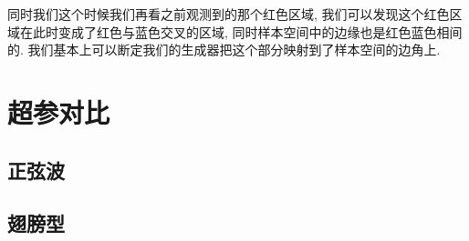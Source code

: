 \documentclass[lang=cn,11pt]{elegantpaper}
\begin{document}
同时我们这个时候我们再看之前观测到的那个红色区域, 我们可以发现这个红色区域在此时变成了红色与蓝色交叉的区域, 同时样本空间中的边缘也是红色蓝色相间的. 我们基本上可以断定我们的生成器把这个部分映射到了样本空间的边角上.

\section{超参对比}

\subsection{正弦波}

\subsection{翅膀型}

\nocite{*}



\end{document}
